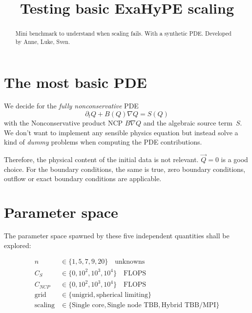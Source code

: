 \documentclass{article}
\begin{document}
\title {Testing basic ExaHyPE scaling} 

\maketitle

\begin{abstract}
Mini benchmark to understand when scaling fails. With a synthetic
PDE. Developed by Anne, Luke, Sven.
\end{abstract}


\section{The most basic PDE}

We decide for the \emph{fully nonconservative} PDE
\begin{equation}\label{pde}
\partial_t Q + B(Q)\nabla Q = S(Q)
\end{equation}
%
with the Nonconservative product NCP $B\nabla Q$ and the
algebraic source term~$S$. We don't want to implement any
sensible physics equation but instead solve a kind of
\emph{dummy} problems when computing the PDE contributions.

Therefore, the physical content of the initial data is not
relevant. $\vec Q=0$ is a good choice. For the boundary
conditions, the same is true, zero boundary conditions,
outflow or exact boundary conditions are applicable.

\section{Parameter space}

The parameter space spawned by these five independent
quantities shall be explored:

\begin{align}
n& \in \{ 1,5,7,9,20 \} \quad\text{unknowns}
\\
C_S &\in \{ 0, 10^2, 10^3, 10^4 \} \quad\text{FLOPS}
\\
C_{NCP} &\in \{ 0, 10^2, 10^3, 10^4 \} \quad\text{FLOPS}
\\
\text{grid} &\in  \{ \text{unigrid}, \text{spherical limiting} \}
\\
\text{scaling} &\in  \{ \text{Single core}, \text{Single node TBB}, \text{Hybrid TBB/MPI} \}
\end{align}
%
\end{document}
